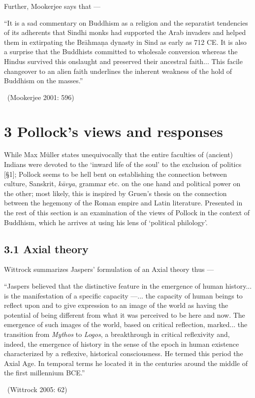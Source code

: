 Further, Mookerjee says that —

\begin{myquote}
“It is a sad commentary on Buddhism as a religion and the separatist tendencies of its adherents that Sindhi monks had supported the Arab invaders and helped them in extirpating the Brāhmaṇa dynasty in Sind as early as 712 CE. It is also a surprise that the Buddhists committed to wholesale conversion whereas the Hindus survived this onslaught and preserved their ancestral faith... This facile changeover to an alien faith underlines the inherent weakness of the hold of Buddhism on the masses.” 

~\hfill (Mookerjee 2001: 596)
\end{myquote}



\section*{3 Pollock’s views and responses}

While Max Müller states unequivocally that the entire faculties of (ancient) Indians were devoted to the ‘inward life of the soul’ to the exclusion of politics [§1]; Pollock seems to be hell bent on establishing the connection between culture, Sanskrit, \textit{kāvya}, grammar etc. on the one hand and political power on the other; most likely, this is inspired by Gruen’s thesis on the connection between the hegemony of the Roman empire and Latin literature. Presented in the rest of this section is an examination of the views of Pollock in the context of Buddhism, which he arrives at using his lens of ‘political philology’.

\subsection*{3.1 Axial theory}

Wittrock summarizes Jaspers’ formulation of an Axial theory thus —

\begin{myquote}
“Jaspers believed that the distinctive feature in the emergence of human history... is the manifestation of a specific capacity —... the capacity of human beings to reflect upon and to give expression to an image of the world as having the potential of being different from what it was perceived to be here and now. The emergence of such images of the world, based on critical reflection, marked... the transition from \textit{Mythos} to \textit{Logos}, a breakthrough in critical reflexivity and, indeed, the emergence of history in the sense of the epoch in human existence characterized by a reflexive, historical consciousness. He termed this period the Axial Age. In temporal terms he located it in the centuries around the middle of the first millennium BCE.” 

~\hfill (Wittrock 2005: 62)
\end{myquote}

